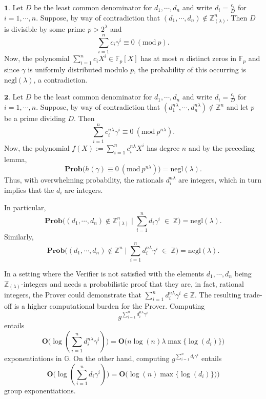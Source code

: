 \documentclass[11pt, lettersize, notitlepage, leqno, footskip=0.6cm]{article}
\newcommand{\bz}{\mathbb Z}
\newcommand{\bFp}{\mathbb{F}_p}
\newcommand{\slim}{\sum\limits}
\newcommand{\negl}{\mr{negl}}
\newcommand{\mb}{\mathbb}
\newcommand{\mbf}{\mathbf}
\newcommand{\mr}{\mathrm}
\newcommand{\lam}{\lambda}
\newcommand{\lamb}{\lambda}
\newcommand{\bzlam}{\bz_{(\lam)}}
\newcommand{\Prob}{\mbf{Prob}}
\newcommand{\vs}{\vspace{-0.15cm}}
\newcommand{\noin}{\noindent}
\newcommand{\op}{overwhelming probability}
\newcommand{\Mod}[1]{\ (\mathrm{mod}\ #1)}
\numberwithin{equation}{section}
\begin{document}
\begin{prf} $\mbf{1}$. Let $D$ be the least common denominator for $d_1,\cdots, d_n$ and write $d_i = \frac{c_i}{D}$ for $i=1,\cdots, n.$ Suppose, by way of contradiction that $(d_1,\cdots, d_n )\notin \bzlam^n$. Then $D$ is divisible by some prime $p>2^{\lam}$ and \vs $$\sum\limits_{i=1}^n  {c_i\gamma^i} \equiv 0\Mod{p}.$$ Now, the polynomial $\sum\limits_{i=1}^n c_iX^i \in \bFp[X]$ has at most $n$ distinct zeros in $\bFp$ and since $\gamma$ is uniformly distributed modulo $p$, the probability of this occurring is $\negl(\lamb)$, a contradiction.\vspace{0.15cm} 

\noin $\mbf{2}$. Let $D$ be the least common denominator for $d_1,\cdots, d_n$ and write $d_i = \frac{c_i}{D}$ for $i=1,\cdots, n.$ Suppose, by way of contradiction that $(d_1^{n\lam},\cdots, d_n^{n\lam} )\notin \bz^n$ and let $p$ be a prime dividing $D$. Then $$\slim_{i=1}^n c_i^{n\lam}\gamma^i \equiv 0\Mod{p^{n\lam}}.$$ Now, the polynomial $f(X):= \slim_{i=1}^n c_i^{n\lam} X^i$ has degree $n$ and by the preceding lemma, \vs $$\mbf{Prob}\big(h(\gamma)\equiv 0\Mod{p^{n\lam}} \big) = \negl(\lam).$$ Thus, with \op, the rationals $d_i^{n\lam}$ are integers, which in turn implies that the $d_i$ are integers.\end{prf}


\begin{comment}
For the second part, note that \vs $$\Prob\big(\sum\limits_{i=1}^n d_i\gamma_j^i\in \bz\;\forall j\big|\; (d_1,\cdots,d_n)\notin \bz\big ) = \Prob\big(\sum\limits_{i=1}^n d_i\gamma^i\in \bz\big|\; (d_1,\cdots,d_n)\notin \bz\big )^{\lam} = \negl(\lam).$$\end{comment}

\noindent In particular, \vs $$\mbf{Prob}\big((d_1,\cdots, d_n)\notin \bzlam^n \;\Big|\;\sum\limits_{i=1}^n d_i\gamma^i\; \in \;\bz \big) = \negl(\lamb).$$ Similarly, \vs $$ \mbf{Prob}\big((d_1,\cdots, d_n)\notin \bz^n \;\Big|\;\sum\limits_{i=1}^n d_i^{n\lam}\gamma^i\; \in \;\bz \big) = \negl(\lamb). $$


In a setting where the Verifier is not satisfied with the elements $d_1,\cdots, d_n$ being $\bzlam$-integers and needs a probabilistic proof that they are, in fact, rational integers, the Prover could demonstrate that $\sum\limits_{i=1}^n d_i^{n\lam}\gamma^i\in \bz$. The resulting trade-off is a higher computational burden for the Prover. Computing \vs $$g^{\slim_{i=1}^n d_i^{n\lam} \gamma^i}$$ entails \vs $$\mbf{O}\big(\log(\slim_{i=1}^n d_i^{n\lam} \gamma^i)\big) = \mbf{O}\big(n\log(n)\lam\max\{\log(d_i)\}\big) $$ exponentiations in $\mb{G}$. On the other hand, computing $g^{\slim_{i=1}^n d_i\gamma^i}$ entails \vs $$\mbf{O}\big(\log(\slim_{i=1}^n d_i\gamma^i)\big) = \mbf{O}\big(\log(n)\max\{\log(d_i)\}) \big)$$ group exponentiations.
\end{document}
